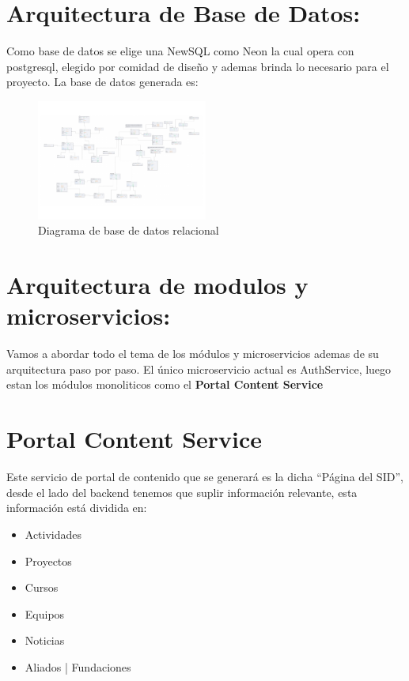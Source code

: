 \documentclass[11pt,a4paper]{article}
\begin{document}
\section{Arquitectura de Base de Datos: }
Como base de datos se elige una NewSQL como Neon la cual opera con postgresql, elegido por comidad de diseño y ademas brinda lo necesario para el proyecto.
La base de datos generada es:
\begin{figure}[H]
	\centering
	\includegraphics[width=0.5\textwidth]{src/ModeloTerminado.pdf}
	\caption{Diagrama de base de datos relacional}
\end{figure}

\section{Arquitectura de modulos y microservicios: }
Vamos a abordar todo el tema de los m{\'o}dulos y microservicios ademas de su arquitectura paso por paso.
El único microservicio actual es AuthService, luego estan los m{\'o}dulos monoliticos como el \textbf{Portal Content Service}
\section{Portal Content Service}
Este servicio de portal de contenido que se generará es la dicha ``Página del SID'', desde el lado del backend tenemos que suplir información relevante,
esta información está dividida en:
\begin{itemize}
	\item Actividades
	\item Proyectos
	\item Cursos
	\item Equipos
	\item Noticias
	\item Aliados | Fundaciones
\end{itemize}
\end{document}
